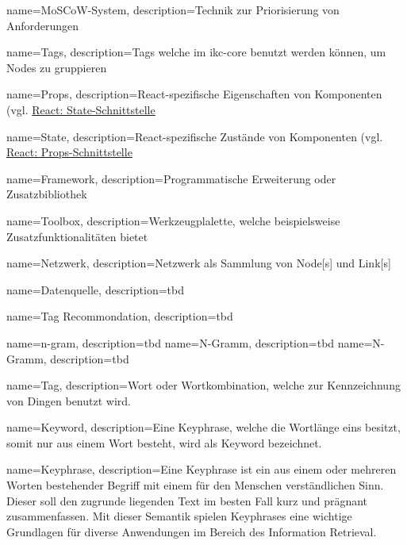 {
    name=MoSCoW-System,
    description={Technik zur Priorisierung von Anforderungen}
    \cite{moscow:hardvard}
}

{
    name=Tags,
    description={Tags welche im \gls{ikc-core} benutzt werden können, um Nodes zu gruppieren}
}

{
    name=Props,
    description={React-spezifische Eigenschaften von Komponenten (vgl. \hyperref[props]{React: State-Schnittstelle}}
}

{
    name=State,
    description={React-spezifische Zustände von Komponenten (vgl. \hyperref[props]{React: Props-Schnittstelle}}
}

{
    name=Framework,
    description={Programmatische Erweiterung oder Zusatzbibliothek}
}

{
    name=Toolbox,
    description={Werkzeugplalette, welche beispielsweise Zu\-satz\-funk\-tio\-na\-li\-tät\-en bietet}
}

{
    name=Netzwerk,
    description={Netzwerk als Sammlung von \gls{Node}[s] und \gls{Link}[s]}
}

{
    name=Datenquelle,
    description={tbd}
}

{
    name=Tag Recommondation,
    description={tbd}
}

{
    name=n-gram,
    description={tbd}
}
{
    name=N-Gramm,
    description={tbd}
}
{
    name=N-Gramm,
    description={tbd}
}

{
    name=Tag,
    description={Wort oder Wortkombination, welche zur Kennzeichnung von Dingen benutzt wird.}
}

{
    name=Keyword,
    description={Eine \gls{Keyphrase}, welche die Wortlänge eins besitzt, somit nur aus einem Wort besteht, wird als Keyword bezeichnet.}
}

{
    name=Keyphrase,
    description={Eine Keyphrase ist ein aus einem oder mehreren Worten bestehender Begriff mit einem für den Menschen verständlichen Sinn. Dieser soll den zugrunde liegenden Text im besten Fall kurz und prägnant zusammenfassen. Mit dieser Semantik  spielen Keyphrases eine wichtige Grundlagen für diverse Anwendungen im Bereich des Information Retrieval.}
}

